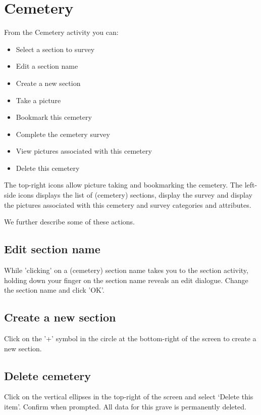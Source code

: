 \documentclass{scrreprt}
\begin{document}
\section{Cemetery}
From the Cemetery activity you can:
\begin{itemize}
\item Select a section to survey
\item Edit a section name
\item Create a new section
\item Take a picture
\item Bookmark this cemetery
\item Complete the cemetery survey
\item View pictures associated with this cemetery
\item Delete this cemetery
\end{itemize}

The top-right icons allow picture taking and bookmarking the cemetery. The left-side icons displays the list of (cemetery) sections, display the survey and display the pictures associated with this cemetery and survey categories and attributes.

We further describe some of these actions.

\subsection{Edit section name}
While 'clicking' on a (cemetery) section name takes you to the section activity, holding down  your finger on the section name reveals an edit dialogue. Change the section name and click 'OK'.

\subsection{Create a new section}
Click on the '+' symbol in the circle at the bottom-right of the screen to create a new section.

\subsection{Delete cemetery}
Click on the vertical ellipses in the top-right of the screen and select `Delete this item'. Confirm when prompted. All data for this grave is permanently deleted.
\end{document}
